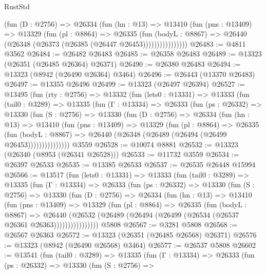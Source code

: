 \begin{lexlean}{RustStd}
\begin{coremodule}
                  (fun (D : @2756) =>
                  @26334
                    (fun (hn : @13) =>
                    @13410
                      (fun (pns : @13409) =>
                      @13329
                        (fun (pl : @8864) =>
                        @26335
                          (fun (bodyL : @8867) =>
                          @26440 (@26348 (@26373 (@26385 (@26447 @26453))))))))))))))))
@26483 := @4811 @3562
@26484 := @26482 @26483
@26485 := @26358 @26483
@26489 := @13323 (@26351 (@26485 @26364) @26371)
@26490 := @26380 @26483
@26494 := @13323 (@8942 (@26490 @26364) @3464)
@26496 := @26443 (@13370 @26483)
@26497 := @13355 @26496
@26499 := @13323 (@26497 @26394)
@26527 := @13495
    (fun (rty : @2756) =>
    @13332
      (fun (lets0 : @13331) =>
      @13333
        (fun (tail0 : @3289) =>
        @13335
          (fun (Γ : @13334) =>
          @26333
            (fun (ps : @26332) =>
            @13330
              (fun (S : @2756) =>
              @13330
                (fun (D : @2756) =>
                @26334
                  (fun (hn : @13) =>
                  @13410
                    (fun (pns : @13409) =>
                    @13329
                      (fun (pl : @8864) =>
                      @26335
                        (fun (bodyL : @8867) =>
                        @26440 (@26348 (@26489 (@26494 (@26499 @26453)))))))))))))))
    @3559
@26528 := @10074 @8881
@26532 := @13323 (@26340 (@8953 (@26341 @26528)))
@26533 := @11732 @3559
@26534 := @26397 @26533
@26535 := @13385 @26533
@26537 := @26535 @26448 @15994
@26566 := @13517
    (fun (lets0 : @13331) =>
    @13333
      (fun (tail0 : @3289) =>
      @13335
        (fun (Γ : @13334) =>
        @26333
          (fun (ps : @26332) =>
          @13330
            (fun (S : @2756) =>
            @13330
              (fun (D : @2756) =>
              @26334
                (fun (hn : @13) =>
                @13410
                  (fun (pns : @13409) =>
                  @13329
                    (fun (pl : @8864) =>
                    @26335
                      (fun (bodyL : @8867) =>
                      @26440
                        (@26532
                          (@26489 (@26494 (@26499 (@26534 (@26537 @26361 @26363))))))))))))))))
    @5808
@26567 := @3281 @5808
@26568 := @26567 @26363
@26572 := @13323 (@26351 (@26485 @26568) @26371)
@26576 := @13323 (@8942 (@26490 @26568) @3464)
@26577 := @26537 @5808
@26602 := @13541
    (fun (tail0 : @3289) =>
    @13335
      (fun (Γ : @13334) =>
      @26333
        (fun (ps : @26332) =>
        @13330
          (fun (S : @2756) =>

\end{coremodule}
\end{lexlean}
